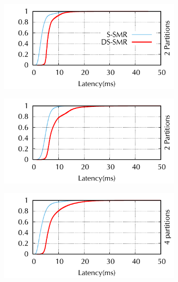 \begin{figure}[ht!]
\centering
\begin{subfigure}{.48\textwidth}
      \centering
      \includegraphics[width=\textwidth]{./figures/experiments/dssmr/latency-cdf-mix-2p}
\end{subfigure}
\begin{subfigure}{.48\textwidth}
      \centering
      \includegraphics[width=\textwidth]{./figures/experiments/dssmr/latency-cdf-post-2p}
\end{subfigure}
\begin{subfigure}{.48\textwidth}
      \centering
      \includegraphics[width=\textwidth]{./figures/experiments/dssmr/latency-cdf-mix-4p}

\end{subfigure}
\end{figure}
